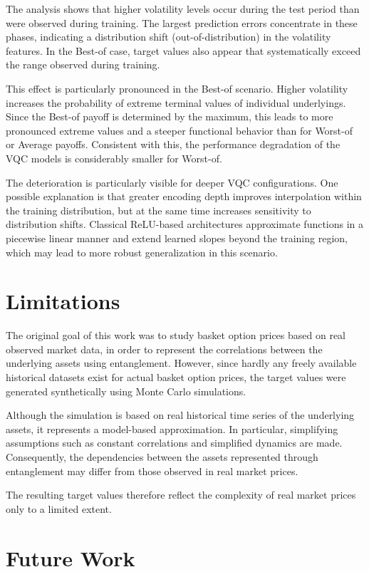 The analysis shows that higher volatility levels occur during the
test period than were observed during training. The largest prediction
errors concentrate in these phases, indicating a distribution shift
(out-of-distribution) in the volatility features. In the Best-of case,
target values also appear that systematically exceed the range
observed during training.

This effect is particularly pronounced in the Best-of scenario.
Higher volatility increases the probability of extreme terminal
values of individual underlyings. Since the Best-of payoff is
determined by the maximum, this leads to more pronounced extreme
values and a steeper functional behavior than for Worst-of or
Average payoffs. Consistent with this, the performance degradation
of the VQC models is considerably smaller for Worst-of.

The deterioration is particularly visible for deeper VQC
configurations. One possible explanation is that greater encoding
depth improves interpolation within the training distribution,
but at the same time increases sensitivity to distribution shifts.
Classical ReLU-based architectures approximate functions in a
piecewise linear manner and extend learned slopes beyond the
training region, which may lead to more robust generalization in
this scenario.

\section{Limitations}

The original goal of this work was to study basket option prices
based on real observed market data, in order to represent the
correlations between the underlying assets using entanglement.
However, since hardly any freely available historical datasets
exist for actual basket option prices, the target values were
generated synthetically using Monte Carlo simulations.

Although the simulation is based on real historical time series
of the underlying assets, it represents a model-based
approximation. In particular, simplifying assumptions such as
constant correlations and simplified dynamics are made.
Consequently, the dependencies between the assets represented
through entanglement may differ from those observed in real
market prices.

The resulting target values therefore reflect the complexity of
real market prices only to a limited extent.

\section{Future Work}

